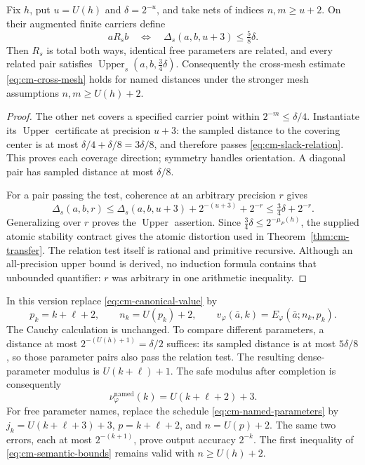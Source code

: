 \begin{lemma}
\label{lem:cm-named-relation}
Fix $h$, put $u=U(h)$ and $\delta=2^{-u}$, and take nets of indices
$n,m\geq u+2$. On their augmented finite carriers define
\begin{equation}
 aR_sb\quad\Longleftrightarrow\quad
 \Delta_s(a,b,u+3)\leq \tfrac58\delta.
 \label{eq:cm-slack-relation}
\end{equation}
Then $R_s$ is total both ways, identical free parameters are related,
and every related pair satisfies
$\operatorname{Upper}_s(a,b,\tfrac34\delta)$.
Consequently the cross-mesh estimate
\eqref{eq:cm-cross-mesh} holds for named distances under the stronger
mesh assumptions $n,m\geq U(h)+2$.
\end{lemma}
\begin{proof}
The other net covers a specified carrier point within
$2^{-m}\leq\delta/4$. Instantiate its $\operatorname{Upper}$
certificate at precision $u+3$:
the sampled distance to the covering center is at most
$\delta/4+\delta/8=3\delta/8$, and therefore passes
\eqref{eq:cm-slack-relation}. This proves each coverage direction;
symmetry handles orientation. A diagonal pair has sampled distance
at most $\delta/8$.

For a pair passing the test, coherence at an arbitrary precision $r$
gives
\[
 \Delta_s(a,b,r)
 \leq \Delta_s(a,b,u+3)+2^{-(u+3)}+2^{-r}
 \leq \tfrac34\delta+2^{-r}.
\]
Generalizing over $r$ proves the $\operatorname{Upper}$ assertion.
Since $\tfrac34\delta\leq2^{-\mu_P(h)}$, the supplied atomic stability
contract gives the atomic distortion used in
Theorem~\ref{thm:cm-transfer}. The relation test itself is rational
and primitive recursive. Although an all-precision upper bound is
derived, no induction formula contains that unbounded quantifier:
$r$ was arbitrary in one arithmetic inequality.
\end{proof}

In this version replace \eqref{eq:cm-canonical-value} by
\begin{equation}
 p_k=k+\ell+2,\qquad
 n_k=U(p_k)+2,\qquad
 v_\varphi(\bar a,k)=E_\varphi(\bar a;n_k,p_k).
 \label{eq:cm-named-schedule}
\end{equation}
The Cauchy calculation is unchanged. To compare different parameters,
a distance at most $2^{-(U(h)+1)}=\delta/2$ suffices:
its sampled distance is at most $5\delta/8$, so those parameter pairs
also pass the relation test. The resulting dense-parameter modulus is
$U(k+\ell)+1$. The safe modulus after completion is consequently
\begin{equation}
 \nu_\varphi^{\mathrm{named}}(k)=U(k+\ell+2)+3.
 \label{eq:cm-completed-named-modulus}
\end{equation}
For free parameter names, replace the schedule
\eqref{eq:cm-named-parameters} by
$j_k=U(k+\ell+3)+3$, $p=k+\ell+2$, and $n=U(p)+2$.
The same two errors, each at most $2^{-(k+1)}$, prove output
accuracy $2^{-k}$.
The first inequality of \eqref{eq:cm-semantic-bounds} remains valid
with $n\geq U(h)+2$.


